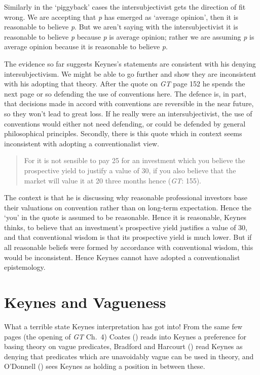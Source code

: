 \documentclass[
  10pt,
  letterpaper,
  DIV=11,
  numbers=noendperiod,
  twoside]{scrartcl}
\begin{document}
Similarly in the `piggyback' cases the intersubjectivist gets the
direction of fit wrong. We are accepting that \emph{p} has emerged as
`average opinion', then it is reasonable to believe \emph{p}. But we
aren't saying with the intersubjectivist it is reasonable to believe
\emph{p} because \emph{p} is average opinion; rather we are assuming
\emph{p} is average opinion because it is reasonable to believe
\emph{p}.

The evidence so far suggests Keynes's statements are consistent with his
denying intersubjectivism. We might be able to go further and show they
are inconsistent with his adopting that theory. After the quote on
\emph{GT} page 152 he spends the next page or so defending the use of
conventions here. The defence is, in part, that decisions made in accord
with conventions are reversible in the near future, so they won't lead
to great loss. If he really were an intersubjectivist, the use of
conventions would either not need defending, or could be defended by
general philosophical principles. Secondly, there is this quote which in
context seems inconsistent with adopting a conventionalist view.

\begin{quote}
For it is not sensible to pay 25 for an investment which you believe the
prospective yield to justify a value of 30, if you also believe that the
market will value it at 20 three months hence (\emph{GT}: 155).
\end{quote}

The context is that he is discussing why reasonable professional
investors base their valuations on convention rather than on long-term
expectation. Hence the `you' in the quote is assumed to be reasonable.
Hence it is reasonable, Keynes thinks, to believe that an investment's
prospective yield justifies a value of 30, and that conventional wisdom
is that its prospective yield is much lower. But if all reasonable
beliefs were formed by accordance with conventional wisdom, this would
be inconsistent. Hence Keynes cannot have adopted a conventionalist
epistemology.

\section{Keynes and Vagueness}\label{keynes-and-vagueness}

What a terrible state Keynes interpretation has got into! From the same
few pages (the opening of \emph{GT} Ch.~4) Coates
() reads into Keynes a preference for
basing theory on vague predicates, Bradford and Harcourt
() read Keynes as denying that
predicates which are unavoidably vague can be used in theory, and
O'Donnell () sees Keynes as holding a
position in between these.
\end{document}
